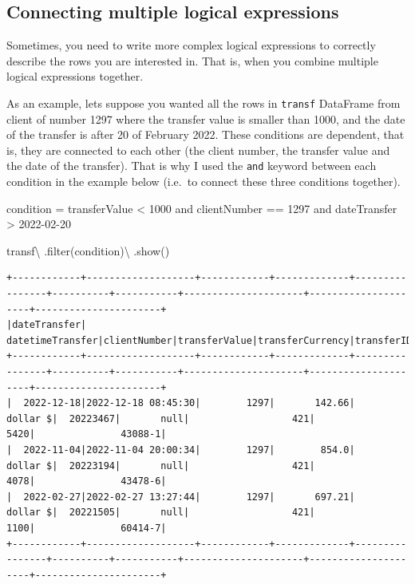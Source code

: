 \documentclass[
  11pt,
  letterpaper,
  DIV=11,
  numbers=noendperiod]{scrreprt}
\newenvironment{Shaded}{\begin{snugshade}}{\end{snugshade}}
\newcommand{\BuiltInTok}[1]{\textcolor[rgb]{0.00,0.23,0.31}{#1}}
\newcommand{\NormalTok}[1]{\textcolor[rgb]{0.00,0.23,0.31}{#1}}
\newcommand{\OperatorTok}[1]{\textcolor[rgb]{0.37,0.37,0.37}{#1}}
\newcommand{\StringTok}[1]{\textcolor[rgb]{0.13,0.47,0.30}{#1}}
\begin{document}
\hypertarget{connecting-multiple-logical-expressions}{%
\subsection{Connecting multiple logical
expressions}\label{connecting-multiple-logical-expressions}}

Sometimes, you need to write more complex logical expressions to
correctly describe the rows you are interested in. That is, when you
combine multiple logical expressions together.

As an example, lets suppose you wanted all the rows in \texttt{transf}
DataFrame from client of number 1297 where the transfer value is smaller
than 1000, and the date of the transfer is after 20 of February 2022.
These conditions are dependent, that is, they are connected to each
other (the client number, the transfer value and the date of the
transfer). That is why I used the \texttt{and} keyword between each
condition in the example below (i.e.~to connect these three conditions
together).

\begin{Shaded}
\begin{Highlighting}[]
\NormalTok{condition }\OperatorTok{=} \StringTok{\textquotesingle{}\textquotesingle{}\textquotesingle{}}
\StringTok{  transferValue \textless{} 1000}
\StringTok{  and clientNumber == 1297 }
\StringTok{  and dateTransfer \textgreater{} \textquotesingle{}2022{-}02{-}20\textquotesingle{}}
\StringTok{\textquotesingle{}\textquotesingle{}\textquotesingle{}}

\NormalTok{transf}\OperatorTok{\textbackslash{}}
\NormalTok{  .}\BuiltInTok{filter}\NormalTok{(condition)}\OperatorTok{\textbackslash{}}
\NormalTok{  .show()}
\end{Highlighting}
\end{Shaded}

\begin{verbatim}
+------------+-------------------+------------+-------------+----------------+----------+-----------+---------------------+---------------------+----------------------+
|dateTransfer|   datetimeTransfer|clientNumber|transferValue|transferCurrency|transferID|transferLog|destinationBankNumber|destinationBankBranch|destinationBankAccount|
+------------+-------------------+------------+-------------+----------------+----------+-----------+---------------------+---------------------+----------------------+
|  2022-12-18|2022-12-18 08:45:30|        1297|       142.66|        dollar $|  20223467|       null|                  421|                 5420|               43088-1|
|  2022-11-04|2022-11-04 20:00:34|        1297|        854.0|        dollar $|  20223194|       null|                  421|                 4078|               43478-6|
|  2022-02-27|2022-02-27 13:27:44|        1297|       697.21|        dollar $|  20221505|       null|                  421|                 1100|               60414-7|
+------------+-------------------+------------+-------------+----------------+----------+-----------+---------------------+---------------------+----------------------+
\end{verbatim}
\end{document}
